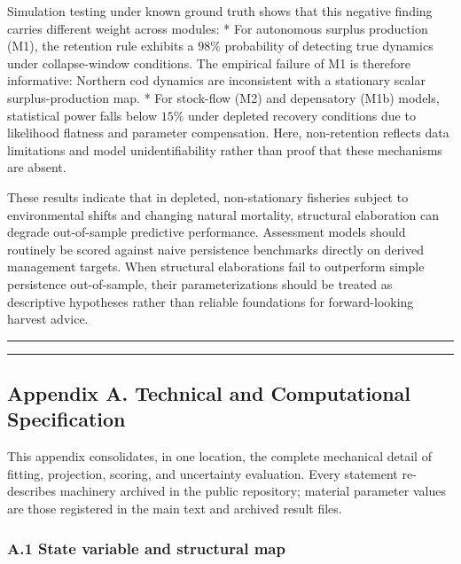 \documentclass[11pt]{article}
\begin{document}
Simulation testing under known ground truth shows that this negative
finding carries different weight across modules: * For autonomous
surplus production (M1), the retention rule exhibits a \(98\%\)
probability of detecting true dynamics under collapse-window conditions.
The empirical failure of M1 is therefore informative: Northern cod
dynamics are inconsistent with a stationary scalar surplus-production
map. * For stock-flow (M2) and depensatory (M1b) models, statistical
power falls below \(15\%\) under depleted recovery conditions due to
likelihood flatness and parameter compensation. Here, non-retention
reflects data limitations and model unidentifiability rather than proof
that these mechanisms are absent.

These results indicate that in depleted, non-stationary fisheries
subject to environmental shifts and changing natural mortality,
structural elaboration can degrade out-of-sample predictive performance.
Assessment models should routinely be scored against naive persistence
benchmarks directly on derived management targets. When structural
elaborations fail to outperform simple persistence out-of-sample, their
parameterizations should be treated as descriptive hypotheses rather
than reliable foundations for forward-looking harvest advice.

\begin{center}\rule{0.5\linewidth}{0.5pt}\end{center}

\begin{center}\rule{0.5\linewidth}{0.5pt}\end{center}

\subsection{Appendix A. Technical and Computational
Specification}\label{appendix-a.-technical-and-computational-specification}

This appendix consolidates, in one location, the complete mechanical
detail of fitting, projection, scoring, and uncertainty evaluation.
Every statement re-describes machinery archived in the public
repository; material parameter values are those registered in the main
text and archived result files.

\subsubsection{A.1 State variable and structural
map}\label{a.1-state-variable-and-structural-map}
\end{document}
